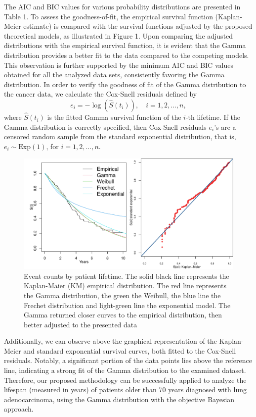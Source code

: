 The AIC and BIC values for various probability distributions are presented in Table 1. To assess the goodness-of-fit, the empirical survival function (Kaplan-Meier estimate) is compared with the survival functions adjusted by the proposed theoretical models, as illustrated in Figure 1. Upon comparing the adjusted distributions with the empirical survival function, it is evident that the Gamma distribution provides a better fit to the data compared to the competing models. This observation is further supported by the minimum AIC and BIC values obtained for all the analyzed data sets, consistently favoring the Gamma distribution. In order to verify the goodness of fit of the Gamma distribution to the cancer data, we calculate the Cox-Snell residuals \citep{cox1968} defined by
\begin{equation*}
    e_i=-\log \left(\hat S(t_i)\right),\quad  i=1,2,\ldots,n,
\end{equation*}
where $\hat S(t_i)$ is the fitted Gamma survival function of the $i$-th lifetime.  If the Gamma distribution  is correctly specified, then Cox-Snell residuals $e_i$'s are a censored random sample from the standard exponential distribution, that is, $e_i\sim \text{Exp}(1)$, for $i=1,2,\ldots,n$.

\begin{figure}[!h] 
	\centering
	\includegraphics[scale=0.50]{survival.pdf}
	\caption{Event counts by patient lifetime. The solid
black line represents the Kaplan-Maier (KM) empirical distribution. The red line
represents the Gamma distribution, the green the Weibull, the blue line the Frechet distribution and light-green line the exponential model. The
Gamma returned closer curves to the empirical distribution, then better adjusted to the
presented data}\label{grafico-obscajust1}
\end{figure}

Additionally, we can observe above the graphical representation of the Kaplan-Meier and standard exponential survival curves, both fitted to the Cox-Snell residuals. Notably, a significant portion of the data points lies above the reference line, indicating a strong fit of the Gamma distribution to the examined dataset. Therefore, our proposed methodology can be successfully applied to analyze the lifespan (measured in years) of patients older than 70 years diagnosed with lung adenocarcinoma, using the Gamma distribution with the objective Bayesian approach.

